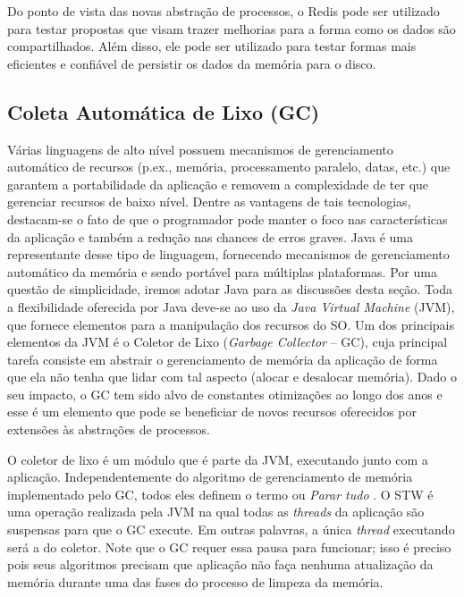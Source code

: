 
Do ponto de vista das novas abstração de processos, o Redis pode ser utilizado
para testar propostas que visam trazer melhorias para a forma como os dados são
compartilhados. Além disso, ele pode ser utilizado para testar formas mais
eficientes e confiável de persistir os dados da memória para o disco.

\subsection{Coleta Automática de Lixo (GC)}
\label{sec:gc}

Várias linguagens de alto nível possuem mecanismos de gerenciamento automático de recursos
(p.ex., memória, processamento paralelo, datas, etc.) que garantem a portabilidade
da aplicação e removem a complexidade de ter que gerenciar recursos de baixo
nível. Dentre as vantagens de tais tecnologias, destacam-se o fato de que o
programador pode manter o foco nas características da aplicação e também a redução
nas chances de erros graves. Java é uma representante desse tipo de
linguagem, fornecendo mecanismos de gerenciamento automático da memória e sendo
portável para múltiplas plataformas. Por uma questão de simplicidade, iremos
adotar Java para as discussões desta seção. Toda a flexibilidade
oferecida por Java deve-se ao uso da \emph{Java Virtual Machine} (JVM), que
fornece elementos para a manipulação dos recursos do SO. Um dos principais
elementos da JVM é o Coletor de Lixo (\emph{Garbage Collector} -- GC), cuja principal tarefa
consiste em abstrair o gerenciamento de memória da aplicação de forma que ela
não tenha que lidar com tal aspecto (alocar e desalocar memória). Dado o seu impacto, o
GC tem sido alvo de constantes otimizações ao longo dos anos e esse é um
elemento que pode se beneficiar de novos recursos oferecidos por extensões às
abstrações de processos.

O coletor de lixo é um módulo que é parte da JVM, executando junto com a aplicação.
Independentemente do algoritmo de gerenciamento de memória implementado pelo
GC, todos eles definem o termo  ou
\emph{Parar tudo} \citep{pauseless}. O STW é uma operação realizada pela
JVM  na qual todas as \emph{threads} da aplicação são suspensas para que o GC execute.
Em outras palavras, a única \emph{thread} executando será a do coletor. Note que o GC
requer essa pausa para funcionar; isso é preciso pois seus algoritmos precisam que
aplicação não faça nenhuma atualização da memória durante uma das fases do
processo de limpeza da memória.

